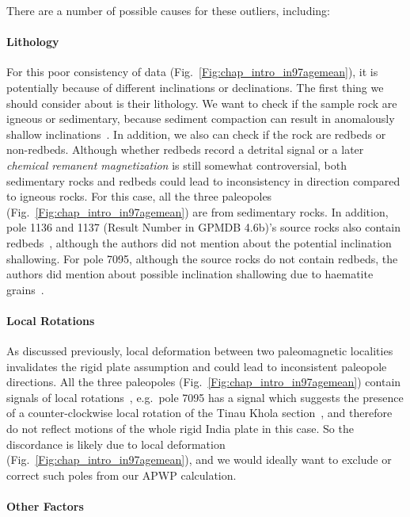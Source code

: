 There are a number of possible causes for these outliers, including:

\paragraph{Lithology}

For this poor consistency of data (Fig.~\ref{Fig:chap_intro_in97agemean}), it is
potentially because of different inclinations or declinations. The first thing
we should consider about is their lithology. We want to check if the sample rock
are igneous or sedimentary, because sediment compaction can result in
anomalously shallow inclinations~\citep{T20}. In addition, we also can check if
the rock are redbeds or non-redbeds. Although whether redbeds record a detrital
signal or a later \emph{chemical remanent magnetization} is still somewhat
controversial, both sedimentary rocks and redbeds could lead to inconsistency in
direction compared to igneous rocks. For this case, all the three paleopoles
(Fig.~\ref{Fig:chap_intro_in97agemean}) are from sedimentary rocks. In addition,
pole 1136 and 1137 (Result Number in GPMDB 4.6b)'s source rocks also contain
redbeds~\citep{O82}, although the authors did not mention about the potential
inclination shallowing. For pole 7095, although the source rocks do not contain
redbeds, the authors did mention about possible inclination shallowing due to
haematite grains~\citep{G94}.

\paragraph{Local Rotations}

As discussed previously, local deformation between two paleomagnetic localities
invalidates the rigid plate assumption and could lead to inconsistent paleopole
directions. All the three paleopoles (Fig.~\ref{Fig:chap_intro_in97agemean})
contain signals of local rotations~\citep{O82,G94}, e.g.\ pole 7095 has a signal
which suggests the presence of a counter-clockwise local rotation of the Tinau
Khola section~\citep{G94}, and therefore do not reflect motions of the whole
rigid India plate in this case. So the discordance is likely due to local
deformation (Fig.~\ref{Fig:chap_intro_in97agemean}), and we would ideally
want to exclude or correct such poles from our APWP calculation.

\paragraph{Other Factors}

